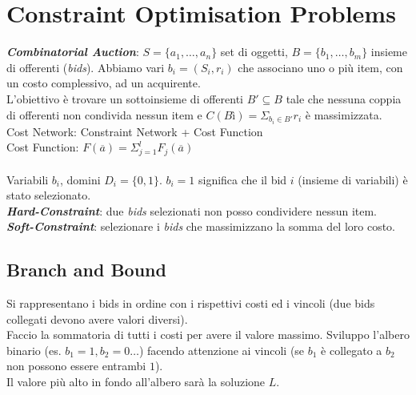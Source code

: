 \documentclass[a4paper, notitlepage, 9pt]{extreport}
\begin{document}
\chapter*{Constraint Optimisation Problems}
\textit{\textbf{Combinatorial Auction}}: $S=\{a_1, \dots , a_n \}$ set di oggetti, $B=\{b_1, \dots , b_m \}$ insieme di offerenti (\textit{bids}). Abbiamo vari $b_i = (S_i, r_i)$ che associano uno o più item, con un costo complessivo, ad un acquirente.\\
L'obiettivo è trovare un sottoinsieme di offerenti $B' \subseteq B$ tale che nessuna coppia di offerenti non condivida nessun item e $C(Bì) = \Sigma_{b_i\in B'} r_i$ è massimizzata.\\
Cost Network: Constraint Network + Cost Function\\
Cost Function: $F(\overline{a}) = \Sigma_{j=1}^l F_j(\overline{a})$\\\\
Variabili $b_i$, domini $D_i = \{0, 1\}$. $b_i = 1$ significa che il bid $i$ (insieme di variabili) è stato selezionato.\\
\textit{\textbf{Hard-Constraint}}: due \textit{bids} selezionati non posso condividere nessun item.\\
\textit{\textbf{Soft-Constraint}}: selezionare i \textit{bids} che massimizzano la somma del loro costo.


\section*{Branch and Bound}
Si rappresentano i bids in ordine con i rispettivi costi ed i vincoli (due bids collegati devono avere valori diversi).\\
Faccio la sommatoria di tutti i costi per avere il valore massimo. Sviluppo l'albero binario (es. $b_1 = 1, b_2 = 0 \dots$) facendo attenzione ai vincoli (se $b_1$ è collegato a $b_2$ non possono essere entrambi $1$).\\
Il valore più alto in fondo all'albero sarà la soluzione $L$.
\end{document}
